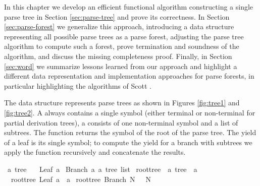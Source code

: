 \begin{isabellebody}
\begin{isamarkuptext}
In this chapter we develop an efficient functional algorithm constructing a single parse
tree in Section \ref{sec:parse-tree} and prove its correctness. In Section \ref{sec:parse-forest}
we generalize this approach, introducing a data structure representing all possible parse trees
as a parse forest, adjusting the parse tree algorithm to compute such a forest, prove termination
and soundness of the algorithm, and discuss the missing completeness proof. Finally, in Section \ref{sec:word}
we summarize lessons learned from our approach and highlight a different data representation and
implementation approaches for parse forests, in particular highlighting the algorithms of Scott \cite{Scott:2008}.%
\end{isamarkuptext}\isamarkuptrue%
%
\isadelimdocument
%
\endisadelimdocument
%
\isatagdocument
%
\isamarkuptrue%
%
\endisatagdocument
{\isafolddocument}%
%
\isadelimdocument
%
\endisadelimdocument
%
\begin{isamarkuptext}%
The data structure  represents parse trees as shown in Figures \ref{fig:tree1} and \ref{fig:tree2}.
A  always contains a single symbol (either terminal or non-terminal for partial derivation trees), a  consists of one non-terminal
symbol and a list of subtrees. The function  returns the symbol of the root of the
parse tree. The yield of a leaf is its single symbol; to compute the yield for a branch with
subtrees  we apply the function  recursively and concatenate the results.%
\end{isamarkuptext}\isamarkuptrue%
\isamarkupfalse%
\ {\isacharprime}{\kern0pt}a\ tree\ {\isacharequal}{\kern0pt}\isanewline
\ \ Leaf\ {\isacharprime}{\kern0pt}a\isanewline
{\isacharbar}{\kern0pt}\ Branch\ {\isacharprime}{\kern0pt}a\ {\isachardoublequoteopen}{\isacharprime}{\kern0pt}a\ tree\ list{\isachardoublequoteclose}\isanewline
\isanewline
{}\isamarkupfalse%
\ root{\isacharunderscore}{\kern0pt}tree\ {\isacharcolon}{\kern0pt}{\isacharcolon}{\kern0pt}\ {\isachardoublequoteopen}{\isacharprime}{\kern0pt}a\ tree\ {\isasymRightarrow}\ {\isacharprime}{\kern0pt}a{\isachardoublequoteclose}\ \isanewline
\ \ {\isachardoublequoteopen}root{\isacharunderscore}{\kern0pt}tree\ {\isacharparenleft}{\kern0pt}Leaf\ a{\isacharparenright}{\kern0pt}\ {\isacharequal}{\kern0pt}\ a{\isachardoublequoteclose}\isanewline
{\isacharbar}{\kern0pt}\ {\isachardoublequoteopen}root{\isacharunderscore}{\kern0pt}tree\ {\isacharparenleft}{\kern0pt}Branch\ N\ {\isacharunderscore}{\kern0pt}{\isacharparenright}{\kern0pt}\ {\isacharequal}{\kern0pt}\ N{\isachardoublequoteclose}\isanewline

\end{isabellebody}
